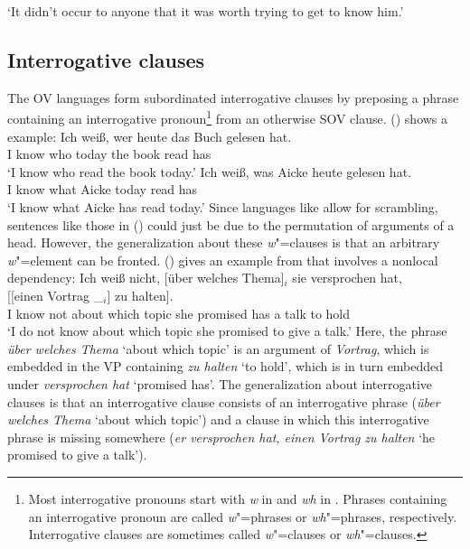 \zl
\ea 
{}
\glt `It didn't occur to anyone that it was worth trying to get to know him.'
\z



\subsection{Interrogative clauses}


The OV languages form subordinated interrogative clauses by preposing a phrase containing an
interrogative pronoun\footnote{
Most interrogative pronouns start with \emph{w} in  and \emph{wh} in . Phrases
containing an interrogative pronoun are called \emph{w}"=phrases or \emph{wh}"=phrases,
respectively. Interrogative clauses are sometimes called \emph{w}"=clauses or \emph{wh}"=clauses.
} from an
otherwise SOV clause. () shows a  example:
\eal
\ex 
\gll Ich weiß, wer heute das Buch gelesen hat.\\
     I know    who today the book read has\\
\glt `I know who read the book today.'
\ex 
\gll Ich weiß, was Aicke heute gelesen hat.\\
     I know    what Aicke today read has\\
\glt `I know what Aicke has read today.'
\zl
Since languages like  allow for scrambling, sentences like those in () could just be due
to the permutation of arguments of a head. However, the generalization about these \emph{w}"=clauses
is that an arbitrary \emph{w}"=element can be fronted. () gives an example from  that
involves a nonlocal dependency:
\ea
\gll Ich weiß nicht, [über welches Thema]$_i$ sie versprochen hat,~~~~~~~~ [[einen Vortrag \_$_i$] zu halten].\\
     I know not      \spacebr about which topic she promised has \hphantom{[[}a talk to  hold\\
\glt `I do not know about which topic she promised to give a talk.'
\z
Here, the phrase \emph{über welches Thema} `about which topic' is an argument of \emph{Vortrag},
which is embedded in the VP containing \emph{zu halten} `to hold', which is in turn embedded under
\emph{versprochen hat} `promised has'. The generalization about interrogative clauses is that an
interrogative clause consists of an interrogative phrase (\emph{über welches Thema} `about which
topic') and a clause in which this interrogative phrase is missing somewhere (\emph{er versprochen
  hat, einen Vortrag zu halten} `he promised to give a talk').

